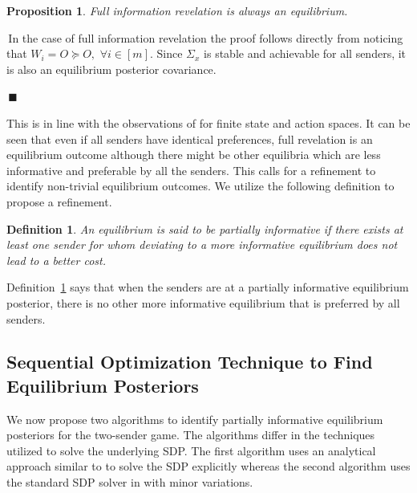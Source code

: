 \documentclass[12pt,journal,onecolumn]{IEEEtran}
\newtheorem{definition}{Definition}
\newtheorem{prop}{{Proposition}}
\newenvironment{Proof}[1]{\medskip\par\noindent{\bf Proof:\,}\,#1}{{\mbox{\,$\blacksquare$}\par}}
\begin{document}
\begin{prop}\label{Prop: Fullinf}
Full information revelation is always an equilibrium.
\end{prop}
\begin{Proof}

In the case of full information revelation the proof follows directly from noticing that $W_i=O\succeq O,$ $\forall i\in[m]$. Since $\Sigma_x$ is stable and achievable for all senders, it is also an equilibrium posterior covariance.
\end{Proof}
This is in line with the observations of \cite{gentzkow2017bayesian, sobel2013giving} for finite state and action spaces. It can be seen that even if all senders have identical preferences, full revelation is an equilibrium outcome although there might be other equilibria which are less informative and preferable by all the senders. This calls for a refinement to identify non-trivial equilibrium outcomes. We utilize the following definition to propose a refinement\cite{bacsar1998dynamic}.
\begin{definition}\label{defn_adm}
An equilibrium is said to be partially informative if there exists at least one sender for whom deviating to a more informative equilibrium does not lead to a better cost.
\end{definition}

Definition~\ref{defn_adm} says that when the senders are at a partially informative equilibrium posterior, there is no other more informative equilibrium that is preferred by all senders. %

\subsection{Sequential Optimization Technique to Find Equilibrium Posteriors}\label{subsect:3_A}
We now propose two algorithms to identify partially informative equilibrium posteriors for the two-sender game. The algorithms differ in the techniques utilized to solve the underlying SDP. The first algorithm uses an analytical approach similar to \cite{tamura2012theory} to solve the SDP explicitly whereas the second algorithm uses the standard SDP solver in \cite{grant2008cvx} with minor variations.

\end{document}
